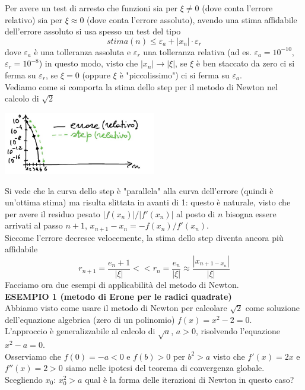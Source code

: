 \documentclass[12pt]{article}
\begin{document}
Per avere un test di arresto che funzioni sia per $\xi \neq 0$ (dove conta l'errore relativo) sia per $\xi \approx 0$ (dove conta l'errore assoluto), avendo una stima affidabile dell'errore assoluto si usa spesso un test del tipo
\begin{equation*}
stima(n) \leq \varepsilon_a + |x_n| \cdot \varepsilon_r
\end{equation*}
dove $\varepsilon_a$ è una tolleranza assoluta e $\varepsilon_r$ una tolleranza relativa (ad es. $\varepsilon_a = 10^{-10}$, $\varepsilon_r = 10^{-8}$) in questo modo, visto che $|x_n| \to |\xi|$, se $\xi$ è  ben staccato da zero ci si ferma su $\varepsilon_r$, se $\xi = 0$ (oppure $\xi$ è "piccolissimo") ci si ferma su $\varepsilon_a$.\\
Vediamo come si comporta la stima dello step per il metodo di Newton nel calcolo di $\sqrt{2}$
\begin{center}
\includegraphics[width=0.5\textwidth]{pag27.JPG}
\end{center}
Si vede che la curva dello step è "parallela" alla curva dell'errore (quindi è un'ottima stima) ma risulta slittata in avanti di 1: questo è naturale, visto che per avere il residuo pesato $|f(x_n)| / |f'(x_n)|$ al posto di $n$ bisogna essere arrivati al passo $n+1$, $x_{n+1} - x_n = -f(x_n)/f'(x_n)$.\\
Siccome l'errore decresce velocemente, la stima dello step diventa ancora più affidabile
\begin{equation*}
    r_{n+1} = \frac{e_n+1}{|\xi|} << r_n = \frac{e_n}{|\xi|} \approx \frac{|x_{n+1 - x_n}|}{|\xi|}
\end{equation*}
Facciamo ora due esempi di applicabilità del metodo di Newton.\\
\textbf{ESEMPIO 1 (metodo di Erone per le radici quadrate)}\\
Abbiamo visto come usare il metodo di Newton per calcolare $\sqrt{2}$ come soluzione dell'equazione algebrica (zero di un polinomio) $f(x) = x^2 - 2 = 0$.\\
L'approccio è generalizzabile al calcolo di $\sqrt{a}$, $a>0$, risolvendo l'equazione $x^2 - a = 0$.\\
Osserviamo che $f(0) = -a < 0$ e $f(b) > 0$ per $b^2 > a$ visto che $f'(x) = 2x$ e $f''(x) = 2 > 0$ siamo nelle ipotesi del teorema di convergenza globale. Scegliendo $x_0$: $x^2_0 > a$ qual è la forma delle iterazioni di Newton in questo caso?
\end{document}
